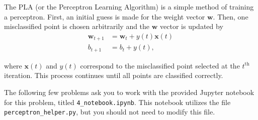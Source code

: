 The PLA (or the Perceptron Learning Algorithm) is a simple method of training a perceptron. First, an initial guess is made for the weight vector $\mathbf{w}$. Then, one misclassified point is chosen arbitrarily and the $\mathbf{w}$ vector is updated by
\begin{align*}
  \mathbf{w}_{t+1} &= \mathbf{w}_t + y(t)\mathbf{x}(t) \\
  b_{t + 1} &= b_t + y(t),
\end{align*}

where $\mathbf{x}(t)$ and $y(t)$ correspond to the misclassified point selected at the $t^\text{th}$ iteration.
This process continues until all points are classified correctly.

The following few problems ask you to work with the provided Jupyter notebook for this problem, titled \texttt{4_notebook.ipynb}. This notebook utilizes the file \texttt{perceptron_helper.py}, but you should not need to modify this file.

